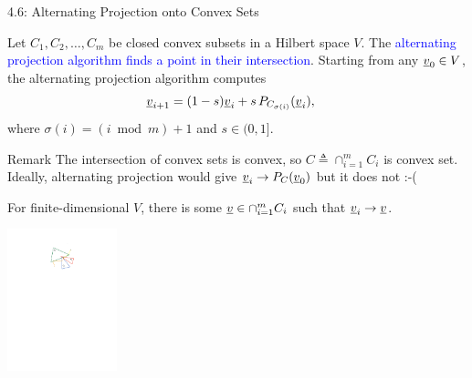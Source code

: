 \documentclass[10pt,english,aspectratio=169]{beamer}
\begin{document}
\begin{frame}{4.6: Alternating Projection onto Convex Sets}

Let $C_{1},C_{2},\ldots,C_{m}$ be closed convex subsets in a Hilbert space $V$.
The \textcolor{blue}{alternating projection algorithm finds a point in their intersection}. Starting from any $\underline v_{0}\in V$, the alternating projection algorithm computes 
\begin{align*}
\underline v_{i+1} & = (1-s) \underline{v}_i + s\, P_{C_{\sigma(i)}}(\underline v_{i}),
\end{align*}
where $\sigma(i)=(i\bmod m)+1$ and $s\in(0,1]$.

\vspace{4mm}

\begin{block}{Remark}
The intersection of convex sets is convex, so $C \triangleq \cap_{i=1}^{m}C_{i}$ is convex set.
Ideally, alternating projection would give $\underline{v}_i \to P_C (\underline{v}_0)$ but it does not :-(
\end{block}

\begin{theorem}[Bregman]
For finite-dimensional $V$, there is some $\underline v\in\cap_{i=1}^{m}C_{i}$ such that $\underline{v}_i \to \underline{v}$.
\end{theorem}

\vspace{-1.1in}
\hspace*{4.6in}
\includegraphics[width=1.25in]{figures/ch4_pocs}

\end{frame}
\end{document}
